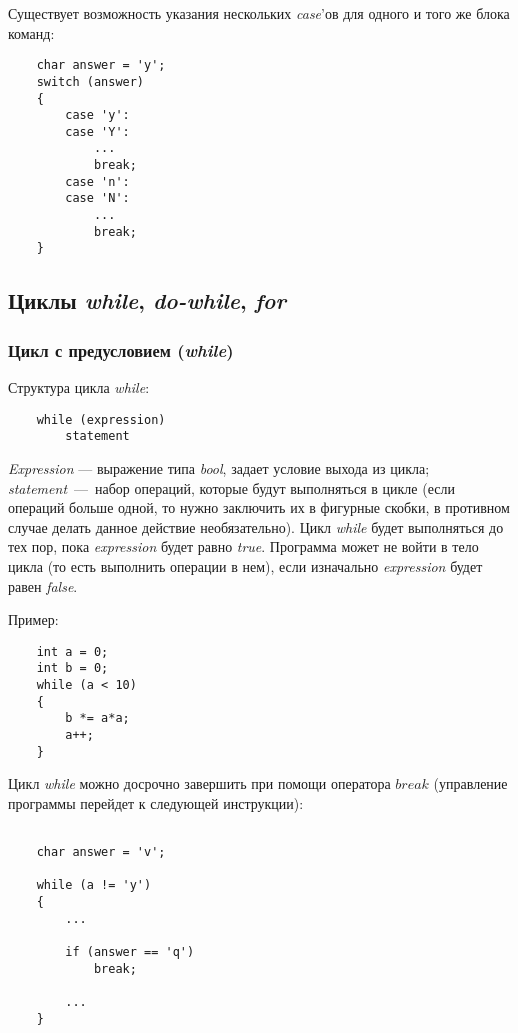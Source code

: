 Существует возможность указания нескольких \textit{case}'ов для одного и того же блока команд:

\begin{lstlisting}
    char answer = 'y';
    switch (answer)
    {
        case 'y':
        case 'Y':
            ...
            break;
        case 'n':
        case 'N':
            ...
            break;
    }
\end{lstlisting}

\subsection{Циклы \textit{while}, \textit{do-while}, \textit{for}}
\subsubsection{Цикл с предусловием (\textit{while})}
Структура цикла \textit{while}:
\begin{lstlisting}
    while (expression)
        statement
\end{lstlisting}

\textit{Expression} --- выражение типа \textit{bool}, задает условие выхода из цикла; \textit{statement}~---~набор операций, которые будут выполняться в цикле (если операций больше одной, то нужно заключить их в фигурные скобки, в противном случае делать данное действие необязательно). Цикл \textit{while} будет выполняться до тех пор, пока \textit{expression} будет равно \textit{true}. Программа может не войти в тело цикла (то есть выполнить операции в нем), если изначально \textit{expression} будет равен \textit{false}.

Пример:

\begin{lstlisting}
    int a = 0;
    int b = 0;
    while (a < 10)
    {
        b *= a*a;
        a++;
    }
\end{lstlisting}

Цикл \textit{while} можно досрочно завершить при помощи оператора $break$ (управление программы перейдет к следующей инструкции):

\begin{lstlisting}

    char answer = 'v';

    while (a != 'y')
    {
        ...

        if (answer == 'q')
            break;

        ...
    }

\end{lstlisting}

